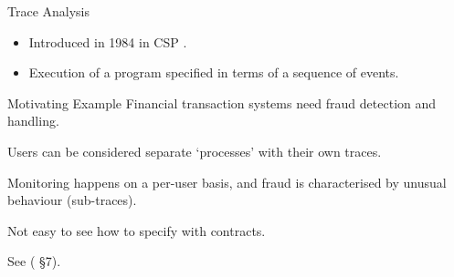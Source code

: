 \documentclass[12pt]{beamer}
\begin{document}
\begin{frame}{Trace Analysis}


  \begin{itemize}
    \item Introduced in 1984 in CSP \parencite{cspthy}.
    \item Execution of a program specified in terms of a sequence of events.
  \end{itemize}

\end{frame}

\begin{frame}{Motivating Example}
  Financial transaction systems need fraud detection and handling.

  \vspace{0.25cm}

  Users can be considered separate `processes' with their own traces.

  \vspace{0.25cm}

  Monitoring happens on a per-user basis, and fraud is characterised
  by unusual behaviour (sub-traces).

  \vspace{0.25cm}

  Not easy to see how to specify with contracts.

  \vspace{0.25cm}

  See (\cite{compensate} \S7).

\end{frame}
\end{document}
